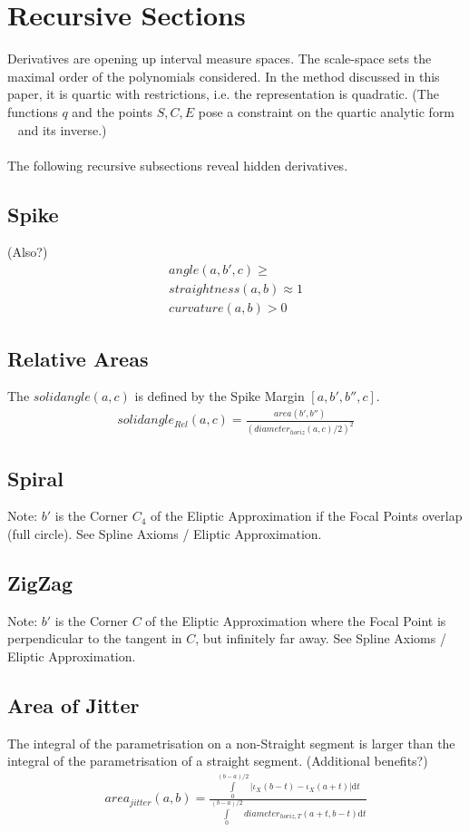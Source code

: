 \documentclass{report}
\begin{document}
\section{Recursive Sections}
Derivatives are opening up interval measure spaces. The scale-space sets the maximal order of the polynomials considered. In the method discussed in this paper, it is quartic with restrictions, i.e. the representation is quadratic.  (The functions $q$ and the points $S,C,E$ pose a constraint on the quartic analytic form ~\cite[Spline\_CharacteristicPolynomials.nb]{Axioms} and its inverse.)\\\\
The following recursive subsections reveal hidden derivatives.

\subsection{Spike}
(Also?)
\begin{align}
angle(a,b',c)\geq\\
straightness(a,b)\approx 1\\
curvature(a,b)>0
\end{align}

\subsection{Relative Areas}
The $solidangle(a,c)$ is defined by the Spike Margin $[a,b',b'',c]$.
\begin{align}
solidangle_{Rel}(a,c) = \frac{area(b',b'')}{(diameter_{horiz}(a,c)/2)^2}
\end{align}

\subsection{Spiral}
Note: $b'$ is the Corner $C_{4}$ of the Eliptic Approximation if the Focal Points overlap (full circle). See Spline Axioms / Eliptic Approximation.

\subsection{ZigZag}
Note: $b'$ is the Corner $C$ of the Eliptic Approximation where the Focal Point is perpendicular to the tangent in $C$, but infinitely far away. See Spline Axioms / Eliptic Approximation.

\subsection{Area of Jitter}
The integral of the parametrisation on a non-Straight segment is larger than the integral of the parametrisation of a straight segment. (Additional benefits?)
\begin{align}
area_{jitter}(a,b)=\frac{\int \limits _{0}^{(b-a)/2} \lvert \iota_{X}(b-t)-\iota_{X}(a+t)\rvert \mathrm{d}t}{\int \limits _{0}^{(b-a)/2} diameter_{horiz,T}(a+t,b-t)\mathrm{d}t}
\end{align}
\end{document}
